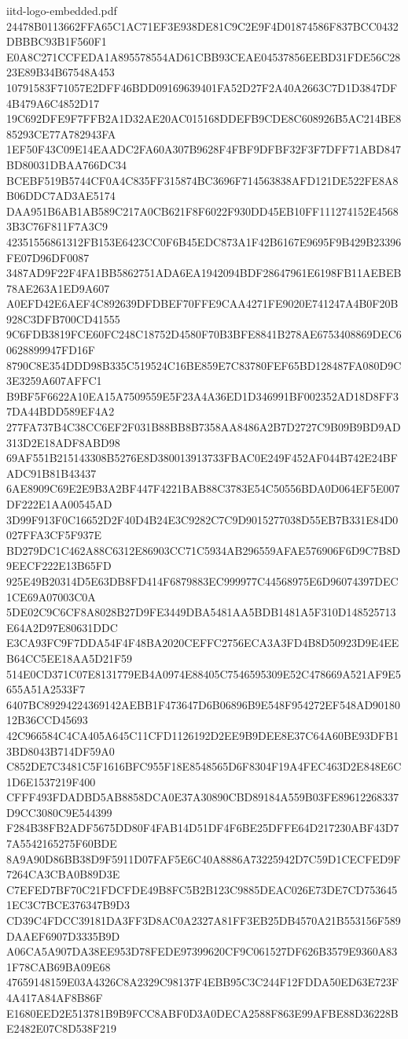 \begin{filecontents*}[overwrite]{iitd-logo-embedded.pdf}
24478B0113662FFA65C1AC71EF3E938DE81C9C2E9F4D01874586F837BCC0432DBBBC93B1F560F1
E0A8C271CCFEDA1A895578554AD61CBB93CEAE04537856EEBD31FDE56C2823E89B34B67548A453
10791583F71057E2DFF46BDD09169639401FA52D27F2A40A2663C7D1D3847DF4B479A6C4852D17
19C692DFE9F7FFB2A1D32AE20AC015168DDEFB9CDE8C608926B5AC214BE885293CE77A782943FA
1EF50F43C09E14EAADC2FA60A307B9628F4FBF9DFBF32F3F7DFF71ABD847BD80031DBAA766DC34
BCEBF519B5744CF0A4C835FF315874BC3696F714563838AFD121DE522FE8A8B06DDC7AD3AE5174
DAA951B6AB1AB589C217A0CB621F8F6022F930DD45EB10FF111274152E45683B3C76F811F7A3C9
42351556861312FB153E6423CC0F6B45EDC873A1F42B6167E9695F9B429B23396FE07D96DF0087
3487AD9F22F4FA1BB5862751ADA6EA1942094BDF28647961E6198FB11AEBEB78AE263A1ED9A607
A0EFD42E6AEF4C892639DFDBEF70FFE9CAA4271FE9020E741247A4B0F20B928C3DFB700CD41555
9C6FDB3819FCE60FC248C18752D4580F70B3BFE8841B278AE6753408869DEC60628899947FD16F
8790C8E354DDD98B335C519524C16BE859E7C83780FEF65BD128487FA080D9C3E3259A607AFFC1
B9BF5F6622A10EA15A7509559E5F23A4A36ED1D346991BF002352AD18D8FF37DA44BDD589EF4A2
277FA737B4C38CC6EF2F031B88BB8B7358AA8486A2B7D2727C9B09B9BD9AD313D2E18ADF8ABD98
69AF551B215143308B5276E8D380013913733FBAC0E249F452AF044B742E24BFADC91B81B43437
6AE8909C69E2E9B3A2BF447F4221BAB88C3783E54C50556BDA0D064EF5E007DF222E1AA00545AD
3D99F913F0C16652D2F40D4B24E3C9282C7C9D9015277038D55EB7B331E84D0027FFA3CF5F937E
BD279DC1C462A88C6312E86903CC71C5934AB296559AFAE576906F6D9C7B8D9EECF222E13B65FD
925E49B20314D5E63DB8FD414F6879883EC999977C44568975E6D96074397DEC1CE69A07003C0A
5DE02C9C6CF8A8028B27D9FE3449DBA5481AA5BDB1481A5F310D148525713E64A2D97E80631DDC
E3CA93FC9F7DDA54F4F48BA2020CEFFC2756ECA3A3FD4B8D50923D9E4EEB64CC5EE18AA5D21F59
514E0CD371C07E8131779EB4A0974E88405C7546595309E52C478669A521AF9E5655A51A2533F7
6407BC89294224369142AEBB1F473647D6B06896B9E548F954272EF548AD9018012B36CCD45693
42C966584C4CA405A645C11CFD1126192D2EE9B9DEE8E37C64A60BE93DFB13BD8043B714DF59A0
C852DE7C3481C5F1616BFC955F18E8548565D6F8304F19A4FEC463D2E848E6C1D6E1537219F400
CFFF493FDADBD5AB8858DCA0E37A30890CBD89184A559B03FE89612268337D9CC3080C9E544399
F284B38FB2ADF5675DD80F4FAB14D51DF4F6BE25DFFE64D217230ABF43D77A5542165275F60BDE
8A9A90D86BB38D9F5911D07FAF5E6C40A8886A73225942D7C59D1CECFED9F7264CA3CBA0B89D3E
C7EFED7BF70C21FDCFDE49B8FC5B2B123C9885DEAC026E73DE7CD7536451EC3C7BCE376347B9D3
CD39C4FDCC39181DA3FF3D8AC0A2327A81FF3EB25DB4570A21B553156F589DAAEF6907D3335B9D
A06CA5A907DA38EE953D78FEDE97399620CF9C061527DF626B3579E9360A831F78CAB69BA09E68
47659148159E03A4326C8A2329C98137F4EBB95C3C244F12FDDA50ED63E723F4A417A84AF8B86F
E1680EED2E513781B9B9FCC8ABF0D3A0DECA2588F863E99AFBE88D36228BE2482E07C8D538F219

\end{filecontents*}
